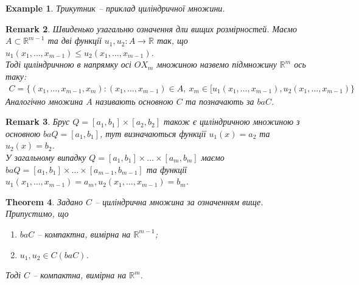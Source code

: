 \documentclass[a4paper, 10pt]{article}
\theoremstyle{theoremdd}
\newtheorem{theorem}{Theorem}[subsection]
\theoremstyle{theoremdd}
\theoremstyle{theoremdd}
\theoremstyle{theoremdd}
\theoremstyle{theoremdd}
\newtheorem{example}[theorem]{Example}
\theoremstyle{theoremdd}
\theoremstyle{theoremdd}
\theoremstyle{theoremdd}
\theoremstyle{theoremdd}
\theoremstyle{theoremdd}
\theoremstyle{theoremdd}
\newtheorem{remark}[theorem]{Remark}
\theoremstyle{theoremdd}
\theoremstyle{theoremdd}
\theoremstyle{theoremdd}
\theoremstyle{theoremdd}
\begin{document}
\begin{example}
Трикутник -- приклад циліндричної множини.
\end{example}

\begin{remark}
Швиденько узагальню означення дли вищих розмірностей. Маємо $A \subset \mathbb{R}^{m-1}$ та дві функції $u_1,u_2 \colon A \to \mathbb{R}$ так, що $u_1(x_1,\dots,x_{m-1}) \leq u_2(x_1,\dots,x_{m-1})$. \\
Тоді циліндричною в напрямку осі $OX_m$ множиною назвемо підмножину $\mathbb{R}^m$ ось таку:
\begin{align*}
C = \{ (x_1,\dots,x_{m-1},x_m): (x_1,\dots,x_{m-1}) \in A,\ x_m \in [u_1(x_1,\dots,x_{m-1}),u_2(x_1,\dots,x_{m-1}) \}
\end{align*}
Аналогічно множина $A$ називають основною $C$ та позначають за $baC$.
\end{remark}

\begin{remark}
Брус $Q = [a_1,b_1] \times [a_2,b_2]$ також є циліндричною множиною з основною $baQ = [a_1,b_1]$, тут визначаються функції $u_1(x) = a_2$ та $u_2(x) = b_2$.\\
У загальному випадку $Q = [a_1,b_1] \times \dots \times [a_m,b_m]$ маємо $baQ = [a_1,b_1] \times \dots \times [a_{m-1},b_{m-1}]$ та функції $u_1(x_1,\dots,x_{m-1}) = a_m, u_2(x_1,\dots,x_{m-1}) = b_m$.
\end{remark}

\begin{theorem}
Задано $C$ -- циліндрична множина за означенням вище. Припустимо, що
\begin{enumerate}[nosep,wide=0pt,label={\arabic*)}]
\item $ba C$ -- компактна, вимірна на $\mathbb{R}^{m-1}$;
\item $u_1,u_2 \in C(ba C)$.
\end{enumerate}
Тоді $C$ -- компактна, вимірна на $\mathbb{R}^m$.
\end{theorem}
\end{document}
